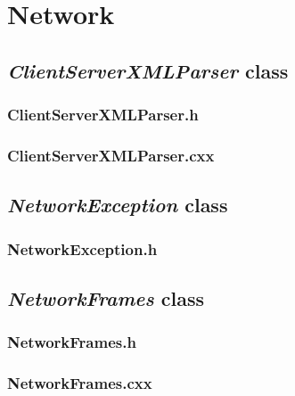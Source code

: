 \chapter{Network}

\section{\textit{ClientServerXMLParser} class}

\subsection{ClientServerXMLParser.h}


\newpage

\subsection{ClientServerXMLParser.cxx}


\newpage


\section{\textit{NetworkException} class}

\subsection{NetworkException.h}


\newpage


\section{\textit{NetworkFrames} class}

\subsection{NetworkFrames.h}


\newpage

\subsection{NetworkFrames.cxx}


\newpage


